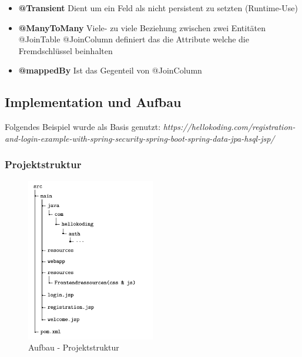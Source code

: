 \begin{itemize}
            \item \textbf{@Transient} 
            \subitem Dient um ein Feld als nicht persistent zu setzten (Runtime-Use) 
            
            \item \textbf{@ManyToMany} 
            \subitem Viele- zu viele Beziehung zwischen zwei Entitäten @JoinTable @JoinColumn deﬁniert das die Attribute welche die Fremdschlüssel beinhalten 
            
            \item \textbf{@mappedBy}
            \subitem Ist das Gegenteil von @JoinColumn

        \end{itemize}
    
    \subsection{Implementation und Aufbau}
        Folgendes Beispiel wurde als Basis genutzt: \textit{https://hellokoding.com/registration-and-login-example-with-spring-security-spring-boot-spring-data-jpa-hsql-jsp/}
        
        \newpage
       
        \subsubsection{Projektstruktur}
            
            \begin{figure}[h]
        	    \centering
        		\includegraphics[width=0.5\textwidth]{images/Unbenannt.PNG}
        	    \caption{Aufbau - Projektstruktur}
            \end{figure}
        
